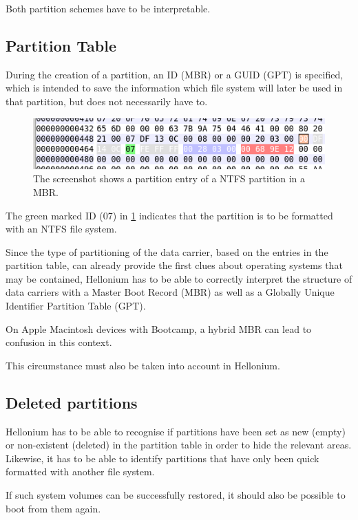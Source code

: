Both partition schemes have to be interpretable.

\subsection{Partition Table}

During the creation of a partition, an ID (MBR) or a GUID (GPT) is specified, which is intended to save the information which file system will later be used in that partition, but does not necessarily have to.

\begin{figure}[htbp]  %
  \centering
  \includegraphics[width=.5\textwidth]{figures/wxhexeditor-mbr-ntfs.png}
  \caption[NTFS partition entry in MBR]{The screenshot shows a partition entry of a NTFS partition in a MBR.}
  \label{fig:NTFSMBR}
\end{figure}

The green marked ID (07) in \cref{fig:NTFSMBR} indicates that the partition is to be formatted with an NTFS file system.

Since the type of partitioning of the data carrier, based on the entries in the partition table, can already provide the first clues about operating systems that may be contained, Hellonium has to be able to correctly interpret the structure of data carriers with a Master Boot Record (MBR) as well as a Globally Unique Identifier Partition Table (GPT).

On Apple Macintosh devices with Bootcamp, a hybrid MBR can lead to confusion in this context. \cite{HybridMBR}

This circumstance must also be taken into account in Hellonium.

\subsection{Deleted partitions}

Hellonium has to be able to recognise if partitions have been set as new (empty) or non-existent (deleted) in the partition table in order to hide the relevant areas. Likewise, it has to be able to identify partitions that have only been quick formatted with another file system.

If such system volumes can be successfully restored, it should also be possible to boot from them again.

